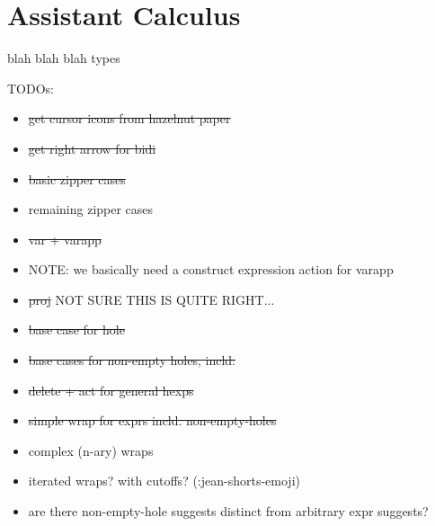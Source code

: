 \section{Assistant Calculus}\label{sec:assistant-calculus}

blah blah blah types

TODOs:
\begin{itemize}
    \item \sout{get cursor icons from hazelnut paper}
    \item \sout{get right arrow for bidi}
    \item \sout{basic zipper cases}
    \item remaining zipper cases
    \item \sout{var + varapp}
    \item NOTE: we basically need a construct expression action for varapp
    \item \sout{proj} NOT SURE THIS IS QUITE RIGHT...
    \item \sout{base case for hole}
    \item \sout{base cases for non-empty holes, incld:}
    \item \sout{delete + act for general hexps}
    \item \sout{simple wrap for exprs incld. non-empty-holes}
    \item complex (n-ary) wraps
    \item iterated wraps? with cutoffs? (:jean-shorts-emoji)
    \item are there non-empty-hole suggests distinct from arbitrary expr suggests?
\end{itemize}

\newcommand{\singleton}[1]{\{ #1 \}}
\newcommand{\singleaction}[1]{\singleton{\mathtt{#1}}}
\newcommand{\varapparrow}[0]{\rightsquigarrow}
\newcommand{\varappjudge}[4]{#1 \vdash #2 \varapparrow #3 \Leftarrow #4}
\newcommand{\projjudge}[4]{#1 \vdash #2 \twoheadrightarrow #3 \Leftarrow #4}

